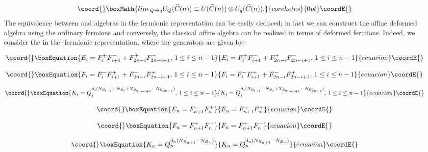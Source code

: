 \documentclass[a4paper,12pt,thmsa]{article}
\begin{document}
\[\coord{}\boxMath{
lim\, _{Q\rightarrow q}U_Q(\widehat{C}(n))\equiv U(\widehat{C}%
(n))\otimes U_q(\widehat{C}(n)).
}{corchetes}{0pt}\coordE{}\]
The equivalence between \coordHE{} and \coordHE{}
algebras in the fermionic representation can be easily deduced; in fact we
can construct the affine deformed algebra \coordHE{} using the
ordinary fermions and conversely, the classical affine algebra \coordHE{} can be realized in terms of deformed fermions. Indeed, we consider the
\coordHE{} in the \coordHE{}-fermionic representation, where the
generators are given by:

\begin{equation}\coord{}\boxEquation{
E_i=F_i^{+}F_{i+1}^{-}+F_{2n-i}^{+}F_{2n-i+1}^{-},\, 1\leq i\leq
n-1
}{
E_i=F_i^{+}F_{i+1}^{-}+F_{2n-i}^{+}F_{2n-i+1}^{-},\, 1\leq i\leq
n-1
}{ecuacion}\coordE{}\end{equation}

\begin{equation}\coord{}\boxEquation{
F_i=F_i^{-}F_{i+1}^{+}+F_{2n-i}^{-}F_{2n-i+1}^{+},\, 1\leq i\leq
n-1
}{
F_i=F_i^{-}F_{i+1}^{+}+F_{2n-i}^{-}F_{2n-i+1}^{+},\, 1\leq i\leq
n-1
}{ecuacion}\coordE{}\end{equation}

\begin{equation}\coord{}\boxEquation{
K_i=Q_i^{d_i(N_{B_{i+1}}-N_{B_i}+N_{B_{_{2n-i+1}}}-N_{B_{2n-i}})},\, 
1\leq i\leq n-1
}{
K_i=Q_i^{d_i(N_{B_{i+1}}-N_{B_i}+N_{B_{_{2n-i+1}}}-N_{B_{2n-i}})},\, 
1\leq i\leq n-1
}{ecuacion}\coordE{}\end{equation}

\begin{equation}\coord{}\boxEquation{
E_{n}=F_{n+1}^{-}F_{n}^{+}
}{
E_{n}=F_{n+1}^{-}F_{n}^{+}
}{ecuacion}\coordE{}\end{equation}

\begin{equation}\coord{}\boxEquation{
F_{n}=F_{n+1}^{+}F_{n}^{-}
}{
F_{n}=F_{n+1}^{+}F_{n}^{-}
}{ecuacion}\coordE{}\end{equation}

\begin{equation}\coord{}\boxEquation{
K_{n}=Q_{n}^{d_{n}(N_{B_{n+1}}-N_{B_{n}})}
}{
K_{n}=Q_{n}^{d_{n}(N_{B_{n+1}}-N_{B_{n}})}
}{ecuacion}\coordE{}\end{equation}
\end{document}
